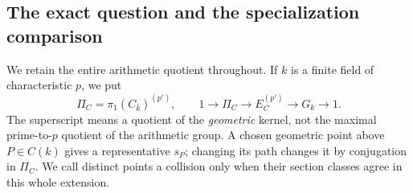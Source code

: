 \documentclass[11pt]{article}
\begin{document}
\subsection{The exact question and the specialization comparison}

We retain the entire arithmetic quotient throughout.  If $k$ is a finite
field of characteristic $p$, we put
\[
 \Pi_C=\pi_1(C_{\bar k})^{(p')},\qquad
 1\longrightarrow\Pi_C\longrightarrow E_C^{(p')}
       \longrightarrow G_k\longrightarrow1.
\]
The superscript means a quotient of the \emph{geometric} kernel, not the
maximal prime-to-$p$ quotient of the arithmetic group.  A chosen geometric
point above $P\in C(k)$ gives a representative $s_P$; changing its path
changes it by conjugation in $\Pi_C$.  We call distinct points a collision
only when their section classes agree in this whole extension.
\end{document}
